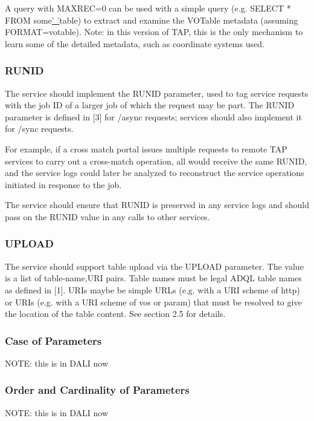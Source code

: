 \documentclass[11pt,a4paper]{ivoa}
\begin{document}
A query with MAXREC=0 can be used with a simple query (e.g. SELECT * FROM  
some\underline{' '}table) to extract and examine the VOTable metadata (assuming 
FORMAT=votable). Note: in this version of TAP, this is the only mechanism to 
learn some of the detailed metadata, such as coordinate systems used.

\subsubsection{RUNID}
The service should implement the RUNID parameter, used to tag service requests 
with the job ID of a larger job of which the request may be part. The RUNID 
parameter is defined in [3] for /async requests; services should also implement 
it for /sync requests.

For example, if a cross match portal issues multiple requests to remote TAP 
services to carry out a cross-match operation, all would receive the same RUNID, 
and the service logs could later be analyzed to reconstruct the service 
operations initiated in response to the job.

The service should ensure that RUNID is preserved in any service logs and  
should pass on the RUNID value in any calls to other services.

\subsubsection{UPLOAD}
The service should support table upload via the UPLOAD parameter. The value is a 
list of table-name,URI pairs. Table names must be legal ADQL table names as 
defined in [1]. URIs maybe be simple URLs (e.g. with a URI scheme of http) or 
URIs (e.g. with a URI scheme of vos or param) that must be resolved to give the 
location of the table content. See section 2.5 for details.

\subsubsection{Case of Parameters}
NOTE: this is in DALI now

\subsubsection{Order and Cardinality of Parameters}
NOTE: this is in DALI now
\end{document}
